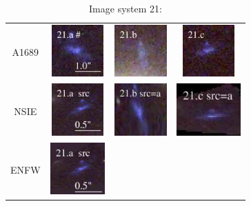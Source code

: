 \documentclass[useAMS,usenatbib]{mn2e}
\begin{document}
\begin{table}
  \caption{Image system 21:}\vspace{0mm}
  \begin{tabular}{cccc}
    \multicolumn{1}{m{1cm}}{{\Large A1689}}
    & \multicolumn{1}{m{1.7cm}}{\includegraphics[height=2.00cm,clip]{figs/nsie_img/rgb.img_21_a.ps}}
    & \multicolumn{1}{m{1.7cm}}{\includegraphics[height=2.00cm,clip]{figs/nsie_img/rgb.img_21_b.ps}}
    & \multicolumn{1}{m{1.7cm}}{\includegraphics[height=2.00cm,clip]{figs/nsie_img/rgb.img_21_c.ps}} \\
    \multicolumn{1}{m{1cm}}{{\Large NSIE}}
    & \multicolumn{1}{m{1.7cm}}{\includegraphics[height=2.00cm,clip]{figs/nsie_img/rgb.src_21_a.ps}}
    & \multicolumn{1}{m{1.7cm}}{\includegraphics[height=2.00cm,clip]{figs/nsie_img/rgb.pre_21_b_a_tri.ps}}
    & \multicolumn{1}{m{1.7cm}}{\includegraphics[height=2.00cm,clip]{figs/nsie_img/rgb.pre_21_c_a_tri.ps}} \\
    \multicolumn{1}{m{1cm}}{{\Large ENFW}}
    & \multicolumn{1}{m{1.7cm}}{\includegraphics[height=2.00cm,clip]{figs/enfw_img/rgb.src_21_a.ps}}

\end{tabular}
\end{table}
\end{document}
